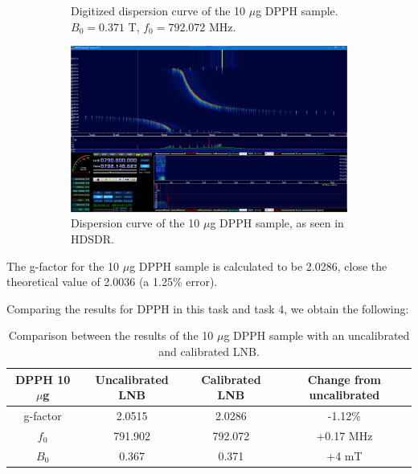 \documentclass{article}
\begin{document}
\begin{figure}[h]
	\centering
	\begin{subfigure}[t]{0.45\textwidth}
		\centering
		\scalebox{0.45}{}
		\caption{Digitized dispersion curve of the 10 $\mu$g DPPH sample. $B_0 = 0.371$ T, $f_0 = 792.072$ MHz.}
		\label{fig:DPPH10mgDigitizedCalibrated}
	\end{subfigure}
	\hfill
	\begin{subfigure}[t]{0.45\textwidth}
		\centering
		\includegraphics[width=\textwidth]{Figures/Task 6/DPPH10mgCalibrated.png}
		\caption{Dispersion curve of the 10 $\mu$g DPPH sample, as seen in HDSDR.}
		\label{fig:DPPH10mgCalibrated}
	\end{subfigure}
	\caption{}
	\label{fig:DPPHCalibrated}
\end{figure}

The g-factor for the 10 $\mu$g DPPH sample is calculated to be 2.0286, close the theoretical value of 2.0036 (a 1.25\% error).	

Comparing the results for DPPH in this task and task 4, we obtain the following:

\begin{table}[h]
	\centering
	\begin{tabular}{|c|c|c|c|}
	\hline
	DPPH 10 $\mu$g & Uncalibrated LNB & Calibrated LNB & Change from uncalibrated \\ \hline
g-factor       & 2.0515           & 2.0286         & -1.12\%                  \\ \hline
$f_0$          & 791.902          & 792.072        & +0.17 MHz                \\ \hline
$B_0$          & 0.367            & 0.371          & +4 mT                    \\ \hline
	\end{tabular}
	\caption{Comparison between the results of the 10 $\mu$g DPPH sample with an uncalibrated and calibrated LNB.}
\end{table}
\end{document}
